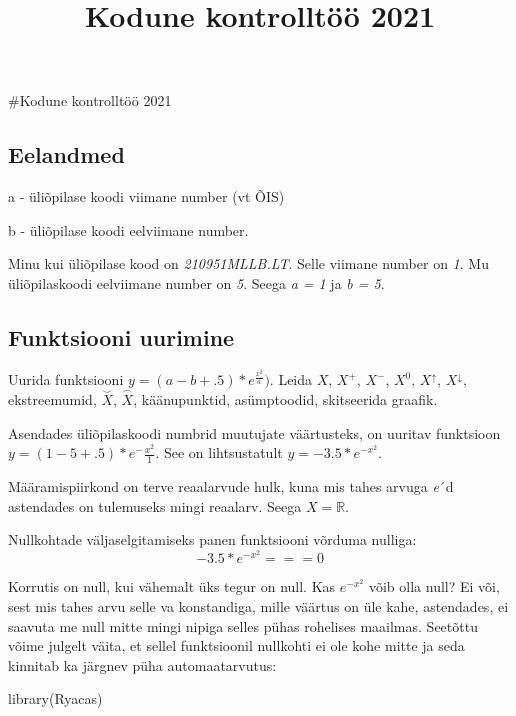 \documentclass[
]{article}
\title{Kodune kontrolltöö 2021}
\author{}
\date{\vspace{-2.5em}}
\newenvironment{Shaded}{\begin{snugshade}}{\end{snugshade}}
\newcommand{\FunctionTok}[1]{\textcolor[rgb]{0.00,0.00,0.00}{#1}}
\newcommand{\NormalTok}[1]{#1}
\begin{document}
\maketitle

{
\setcounter{tocdepth}{2}
\tableofcontents
}
\#Kodune kontrolltöö 2021

\hypertarget{eelandmed}{%
\subsection{Eelandmed}\label{eelandmed}}

a - üliõpilase koodi viimane number (vt ÕIS)

b - üliõpilase koodi eelviimane number.

Minu kui üliõpilase kood on \emph{210951MLLB.LT}. Selle viimane number on \emph{1}. Mu üliõpilaskoodi eelviimane number on \emph{5}. Seega \emph{a = 1} ja \emph{b = 5}.

\hypertarget{funktsiooni-uurimine}{%
\subsection{Funktsiooni uurimine}\label{funktsiooni-uurimine}}

Uurida funktsiooni \(y = (a - b + .5) * e ^ \frac{x ^ 2}{a})\). Leida \(X\), \(X ^ +\), \(X ^ -\), \(X ^ 0\), \(X ^ \uparrow\), \(X ^ \downarrow\), ekstreemumid, \(\overset{\smile}{X}\), \(\overset{\frown}{X}\), käänupunktid, asümptoodid, skitseerida graafik.

Asendades üliõpilaskoodi numbrid muutujate väärtusteks, on uuritav funktsioon \(y = (1 - 5 + .5) * e ^ -\frac{x ^ 2}{1}\). See on lihtsustatult \(y = -3.5 * e ^ {-x ^ 2}\).

Määramispiirkond on terve reaalarvude hulk, kuna mis tahes arvuga \emph{e}´d astendades on tulemuseks mingi reaalarv. Seega \(X = \mathbb{R}\).

Nullkohtade väljaselgitamiseks panen funktsiooni võrduma nulliga:
\[-3.5 * e ^ {-x ^ 2} === 0\]

Korrutis on null, kui vähemalt üks tegur on null. Kas \(e ^ {- x ^ 2}\) võib olla null? Ei või, sest mis tahes arvu selle va konstandiga, mille väärtus on üle kahe, astendades, ei saavuta me null mitte mingi nipiga selles pühas rohelises maailmas. Seetõttu võime julgelt väita, et sellel funktsioonil nullkohti ei ole kohe mitte ja seda kinnitab ka järgnev püha automaatarvutus:

\begin{Shaded}
\begin{Highlighting}[]
\FunctionTok{library}\NormalTok{(Ryacas)}
\end{Highlighting}
\end{Shaded}
\end{document}
